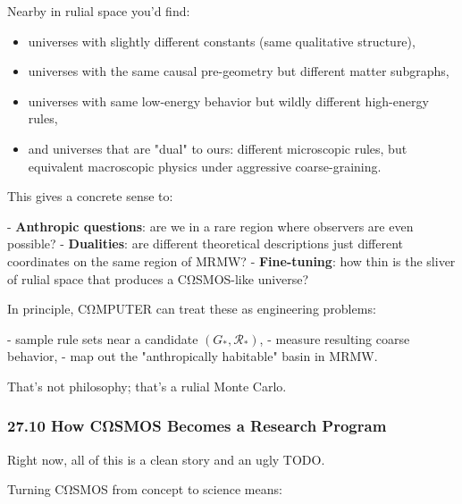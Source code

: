 Nearby in rulial space you’d find:

\begin{itemize}
  \item universes with slightly different constants (same qualitative structure),
  \item universes with the same causal pre-geometry but different matter subgraphs,
  \item universes with same low-energy behavior but wildly different high-energy rules,
  \item and universes that are "dual" to ours: different microscopic rules, but equivalent macroscopic physics under aggressive coarse-graining.
\end{itemize}

This gives a concrete sense to:

- \textbf{Anthropic questions}: are we in a rare region where observers are even possible?
- \textbf{Dualities}: are different theoretical descriptions just different coordinates on the same region of MRMW?
- \textbf{Fine-tuning}: how thin is the sliver of rulial space that produces a CΩSMOS-like universe?

In principle, CΩMPUTER can treat these as engineering problems:

- sample rule sets near a candidate $(G_\ast,\mathcal{R}_\ast)$,
- measure resulting coarse behavior,
- map out the "anthropically habitable" basin in MRMW.

That’s not philosophy; that’s a rulial Monte Carlo.

\subsubsection*{27.10  How CΩSMOS Becomes a Research Program}

Right now, all of this is a clean story and an ugly TODO.

Turning CΩSMOS from concept to science means:

